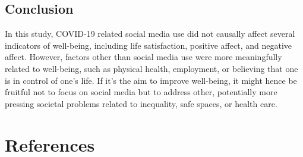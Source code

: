 \documentclass[
  english,
  man,mask,floatsintext]{apa6}
\begin{document}
\hypertarget{conclusion}{%
\subsection{Conclusion}\label{conclusion}}

In this study, COVID-19 related social media use did not causally affect several indicators of well-being, including life satisfaction, positive affect, and negative affect.
However, factors other than social media use were more meaningfully related to well-being, such as physical health, employment, or believing that one is in control of one's life.
If it's the aim to improve well-being, it might hence be fruitful not to focus on social media but to address other, potentially more pressing societal problems related to inequality, safe spaces, or health care.

\newpage

\hypertarget{references}{%
\section{References}\label{references}}
\end{document}
